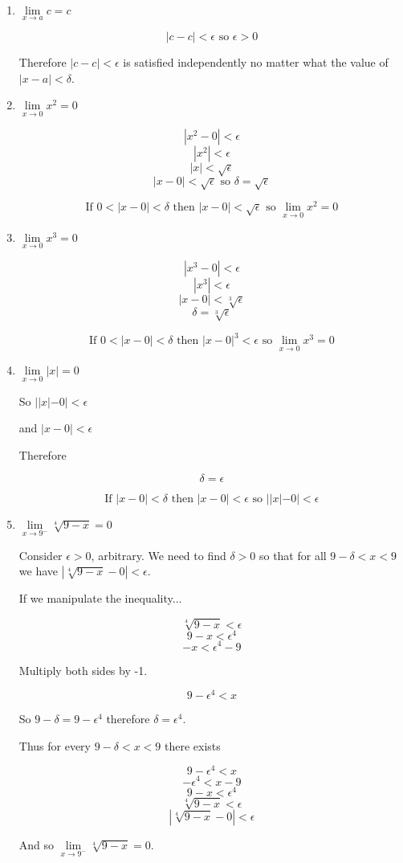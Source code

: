 \documentclass{article}
\begin{document}
\begin{enumerate}
			
		\item $\lim \limits _ {x \to a} c = c$
		
			$$|c - c| < \epsilon \text{ so } \epsilon > 0$$
			
			Therefore $|c - c| < \epsilon$ is satisfied independently no matter what the value of $|x - a| < \delta$.
			
		\item $\lim \limits _{x \to 0} x^2 = 0$
		
			$$|x^2 - 0| < \epsilon$$
			$$|x^2| < \epsilon$$
			$$|x| < \sqrt{\epsilon}$$
			$$|x - 0 | < \sqrt{\epsilon} \text{ so } \delta = \sqrt{\epsilon}$$
			
			$$\text{If } 0 < |x - 0| < \delta \text{ then } |x - 0| < \sqrt{\epsilon} \text{ so } 
			\lim \limits _{x \to 0} x^2 = 0$$
			
		\item $\lim \limits _{x \to 0} x^3 = 0$
		
			$$|x^3 - 0| < \epsilon$$
			$$|x^3| < \epsilon$$
			$$|x - 0| < \sqrt[3]{\epsilon}$$
			$$\delta = \sqrt[3]{\epsilon}$$
			
			$$\text{If } 0 < |x - 0|  < \delta \text{ then } |x - 0|^3 < \epsilon \text { so }
			\lim \limits _{x \to 0} x^3 = 0$$
			
		\item $\lim \limits _{x \to 0} | x | = 0$
		
			So $|| x | - 0 | < \epsilon$
			
			 and $| x - 0 | < \epsilon$
			
			Therefore 
			
				$$ \delta = \epsilon$$
				
			$$\text{If } |x - 0 | < \delta \text{ then } |x - 0| < \epsilon \text{ so } ||x| - 0| < \epsilon$$
		
			
		\item $\lim \limits _{x \to 9^{-}} \sqrt[4]{9 - x} = 0$
		
			Consider $\epsilon > 0$, arbitrary. We need to find $\delta > 0$ so that for all $9 - \delta < x < 9$
			we have $|\sqrt[4]{9 - x}- 0| < \epsilon$.
			
			If we manipulate the inequality...
			
			$$\sqrt[4]{9 - x} < \epsilon$$
			$$9 - x < \epsilon^{4}$$
			$$- x < \epsilon ^{4} - 9$$
			
			 Multiply both sides by -1.
			 
			  $$9 - \epsilon^{4} < x $$ 
			  
			  So $9 - \delta = 9 - \epsilon^{4}$ therefore $\delta = \epsilon^{4}$.
			  
			  Thus for every $9 - \delta < x < 9$ there exists 
			  
			  $$9 - \epsilon^{4} < x $$
			  $$ - \epsilon^{4} < x - 9$$
			  $$ 9 - x < \epsilon^{4}$$
			  $$\sqrt[4]{9 - x} < \epsilon$$
			  $$|\sqrt[4]{9- x} - 0 | < \epsilon$$
			  
			  And so $\lim \limits _{x \to 9^{-}} \sqrt[4]{9 - x} = 0$.
	\end{enumerate}
\end{document}

